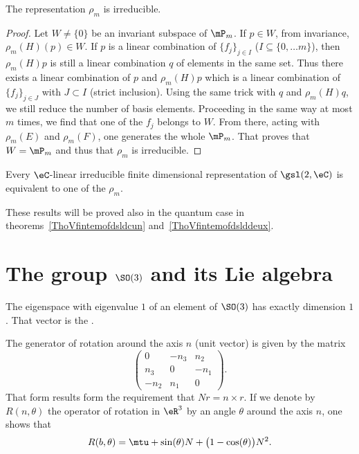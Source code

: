 \begin{proposition}     \label{ProprhomirredsldeuxC}
	The representation $\rho_m$ is irreducible.
\end{proposition}

\begin{proof}
	Let $W\neq\{ 0 \}$ be an invariant subspace of $\mP_m$. If $p\in W$, from invariance, $\rho_m(H)(p)\in W$. If $p$ is a linear combination of $\{ f_j \}_{j\in I}$ ($I\subseteq \{ 0,\ldots m \}$), then $\rho_m(H)p$ is still a linear combination $q$ of elements in the same set. Thus there exists a linear combination of $p$ and $\rho_m(H)p$ which is a linear combination of $\{ f_j \}_{j\in J}$ with $J\subset I$ (strict inclusion). Using the same trick with $q$ and $\rho_m(H)q$, we still reduce the number of basis elements. Proceeding in the same way at most $m$ times, we find that one of the $f_j$ belongs to $W$. From there, acting with $\rho_m(E)$ and $\rho_m(F)$, one generates the whole $\mP_m$. That proves that $W=\mP_m$ and thus that $\rho_m$ is irreducible.
\end{proof}

\begin{theorem}
	Every $\eC$-linear irreducible finite dimensional representation of $\gsl(2,\eC)$ is equivalent to one of the $\rho_m$.
\end{theorem}

These results will be proved also in the quantum case in theorems~\ref{ThoVfintemofdsldcun} and~\ref{ThoVfintemofdslddeux}.

\section{The group \texorpdfstring{$\SO(3)$}{SO3} and its Lie algebra}
\label{SubSecTheGroupSotrois}

\begin{proposition}
	The eigenspace with eigenvalue \( 1\) of an element of $\SO(3)$ has exactly dimension \( 1\). That vector is the .
\end{proposition}

The generator of rotation around the axis $n$ (unit vector) is given by the matrix
\begin{equation}
	\begin{pmatrix}
		0    & -n_3 & n_2  \\
		n_3  & 0    & -n_1 \\
		-n_2 & n_1  & 0
	\end{pmatrix}.
\end{equation}
That form results form the requirement that $Nr=n\times r$. If we denote by $R(n,\theta)$ the operator of rotation in $\eR^3$ by an angle $\theta$ around the axis $n$, one shows that
\begin{equation}
	R(b,\theta)=\mtu+\sin(\theta) N+\big(1-\cos(\theta)\big)N^2.
\end{equation}

